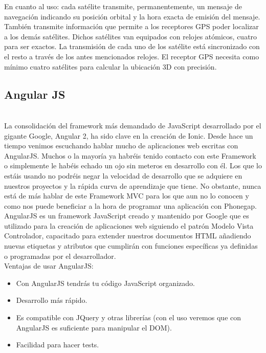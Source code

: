 \documentclass[a4paper, 11pt]{article}
\begin{document}
\begin{itemize}
          En cuanto al uso: cada satélite transmite, permanentemente, un mensaje
          de navegación indicando su posición orbital y la hora exacta de emisión
          del mensaje. También transmite información que permite a los receptores
          GPS poder localizar a los demás satélites. Dichos satélites van
          equipados con relojes atómicos, cuatro para ser exactos. La transmisión
          de cada uno de los satélite está sincronizado con el resto a través de
          los antes mencionados relojes. El receptor GPS necesita como mínimo
          cuatro satélites para calcular la ubicación 3D con precisión.\\

        \subsection{Angular JS}\\

            La consolidación del framework más demandado de JavaScript desarrollado
            por el gigante Google, Angular 2, ha sido clave en la creación de Ionic.
            Desde hace un tiempo venimos escuchando hablar mucho de aplicaciones web
            escritas con AngularJS. Muchos o la mayoría ya habréis tenido contacto
            con este Framework o simplemente le habéis echado un ojo sin meteros en
            desarrollo con él. Los que lo estáis usando no podréis negar la
            velocidad de desarrollo que se adquiere en nuestros proyectos y la
            rápida curva de aprendizaje que tiene. No obstante, nunca está de más
            hablar de este Framework MVC para los que aun no lo conocen y como nos
            puede beneficiar a la hora de programar una aplicación con Phonegap.\\

            AngularJS es un framework JavaScript creado y mantenido por Google que es
            utilizado para la creación de aplicaciones web siguiendo el patrón Modelo
            Vista Controlador, capacitado para extender nuestros documentos HTML
            añadiendo nuevas etiquetas y atributos que cumplirán con funciones
            específicas ya definidas o programadas por el desarrollador.\\

            Ventajas de usar AngularJS:
            \begin{itemize}
              \item {Con AngularJS tendrás tu código JavaScript organizado.}
              \item {Desarrollo más rápido.}
              \item {Es compatible con JQuery y otras librerías (con el uso veremos que
                     con AngularJS es suficiente para manipular el DOM).}
              \item {Facilidad para hacer tests.}
            \end{itemize}


\end{itemize}
\end{document}
